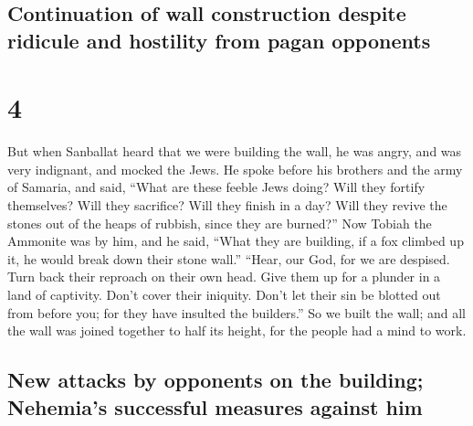 \hypertarget{continuation-of-wall-construction-despite-ridicule-and-hostility-from-pagan-opponents}{%
\subsection{Continuation of wall construction despite ridicule and
hostility from pagan
opponents}\label{continuation-of-wall-construction-despite-ridicule-and-hostility-from-pagan-opponents}}

\hypertarget{section-3}{%
\section{4}\label{section-3}}

 But when Sanballat heard that we were building the wall,
he was angry, and was very indignant, and mocked the Jews.
 He spoke before his brothers and the army of Samaria, and
said, ``What are these feeble Jews doing? Will they fortify themselves?
Will they sacrifice? Will they finish in a day? Will they revive the
stones out of the heaps of rubbish, since they are burned?''
 Now Tobiah the Ammonite was by him, and he said, ``What
they are building, if a fox climbed up it, he would break down their
stone wall.''  ``Hear, our God, for we are despised. Turn
back their reproach on their own head. Give them up for a plunder in a
land of captivity.  Don't cover their iniquity. Don't let
their sin be blotted out from before you; for they have insulted the
builders.''  So we built the wall; and all the wall was
joined together to half its height, for the people had a mind to work.

\hypertarget{new-attacks-by-opponents-on-the-building-nehemias-successful-measures-against-him}{%
\subsection{New attacks by opponents on the building; Nehemia's
successful measures against
him}\label{new-attacks-by-opponents-on-the-building-nehemias-successful-measures-against-him}}


